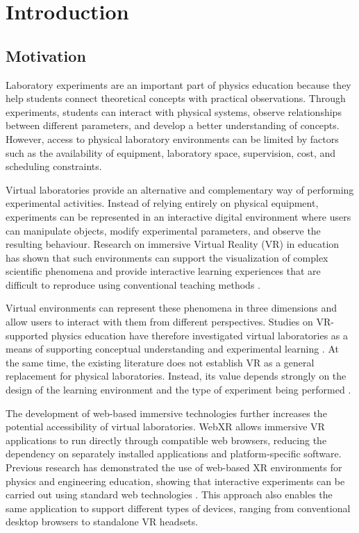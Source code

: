 
\chapter{Introduction}

\section{Motivation}
Laboratory experiments are an important part of physics education because they help students connect theoretical concepts with practical observations. Through experiments, students can interact with physical systems, observe relationships between different parameters, and develop a better understanding of concepts. However, access to physical laboratory environments can be limited by factors such as the availability of equipment, laboratory space, supervision, cost, and scheduling constraints.

Virtual laboratories provide an alternative and complementary way of performing experimental activities. Instead of relying entirely on physical equipment, experiments can be represented in an interactive digital environment where users can manipulate objects, modify experimental parameters, and observe the resulting behaviour. Research on immersive Virtual Reality (VR) in education has shown that such environments can support the visualization of complex scientific phenomena and provide interactive learning experiences that are difficult to reproduce using conventional teaching methods \cite{hamilton2020immersive,georgiou2021learning}.

 Virtual environments can represent these phenomena in three dimensions and allow users to interact with them from different perspectives. Studies on VR-supported physics education have therefore investigated virtual laboratories as a means of supporting conceptual understanding and experimental learning \cite{lakka2023online}. At the same time, the existing literature does not establish VR as a general replacement for physical laboratories. Instead, its value depends strongly on the design of the learning environment and the type of experiment being performed \cite{hamilton2020immersive}.

The development of web-based immersive technologies further increases the potential accessibility of virtual laboratories. WebXR allows immersive VR applications to run directly through compatible web browsers, reducing the dependency on separately installed applications and platform-specific software. Previous research has demonstrated the use of web-based XR environments for physics and engineering education, showing that interactive experiments can be carried out using standard web technologies \cite{zatarain2022experiences}. This approach also enables the same application to support different types of devices, ranging from conventional desktop browsers to standalone VR headsets.

